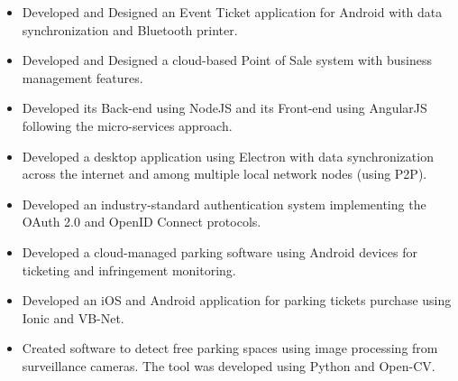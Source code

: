 \documentclass[10pt,a4paper,ragged2e]{altacv}
\begin{document}
\divider

\begin{itemize}
\item Developed and Designed an Event Ticket application for Android with data synchronization and Bluetooth printer.
\item Developed and Designed a cloud-based Point of Sale system with business management features.
\item Developed its Back-end using NodeJS and its Front-end using AngularJS following the micro-services approach.
\item Developed a desktop application using Electron with data synchronization across the internet and among multiple local network nodes (using P2P).
\item Developed an industry-standard authentication system implementing the OAuth 2.0 and OpenID Connect protocols.
\end{itemize}

\divider

\begin{itemize}
\item Developed a cloud-managed parking software using Android devices for ticketing and infringement monitoring.  
\item Developed an iOS and Android application for parking tickets purchase using Ionic and VB-Net.
\item Created software to detect free parking spaces using image processing from surveillance cameras. The tool was developed using Python and Open-CV.
\end{itemize}

\clearpage


\nocite{*}





\printbibliography[heading=pubtype,title={\printinfo{\faGroup}{Conference Proceedings}},type=inproceedings]
% 
\end{document}
